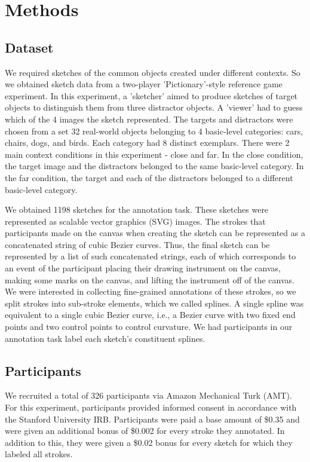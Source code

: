 \documentclass[10pt,letterpaper]{article}
\begin{document}
\section{Methods}

\subsection{Dataset}



We required sketches of the common objects created under different contexts. So we obtained sketch data from a two-player 'Pictionary'-style reference game experiment. In this experiment, a 'sketcher' aimed to produce sketches of target objects to distinguish them from three distractor objects. A 'viewer' had to guess which of the 4 images the sketch represented. The targets and distractors were chosen from a set 32 real-world objects belonging to 4 basic-level categories: cars, chairs, dogs, and birds. Each category had 8 distinct exemplars. There were 2 main context conditions in this experiment - close and far. In the close condition, the target image and the distractors belonged to the same basic-level category. In the far condition, the target and each of the distractors belonged to a different basic-level category.

We obtained 1198 sketches for the annotation task. These sketches were represented as scalable vector graphics (SVG) images. The strokes that participants made on the canvas when creating the sketch can be represented as a concatenated string of cubic Bezier curves.  Thus, the final sketch can be represented by a list of such concatenated strings, each of which corresponds to an event of the participant placing their drawing instrument on the canvas, making some marks on the canvas, and lifting the instrument off of the canvas. We were interested in collecting fine-grained annotations of these strokes, so we split strokes into sub-stroke elements, which we called splines. A single spline was equivalent to a single cubic Bezier curve, i.e., a Bezier curve with two fixed end points and two control points to control curvature. We had participants in our annotation task label each sketch's constituent splines.


\subsection{Participants}

We recruited a total of 326 participants via Amazon Mechanical Turk (AMT).  For this experiment, participants provided informed consent in accordance with the Stanford University IRB. Participants were paid a base amount of \$0.35 and were given an additional bonus of \$0.002 for every stroke they annotated. In addition to this, they were given a \$0.02 bonus for every sketch for which they labeled all strokes. 
\end{document}
